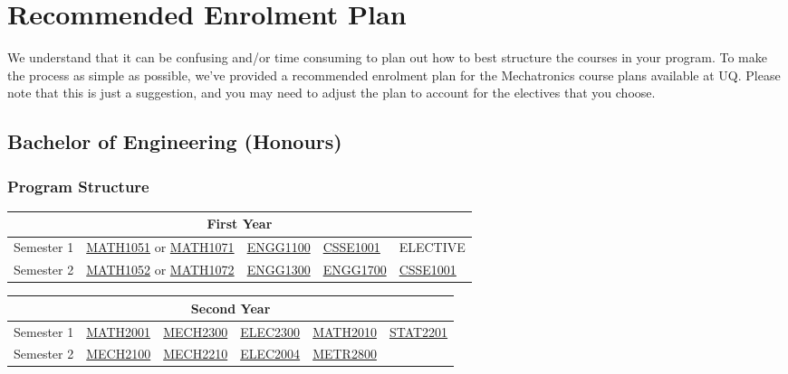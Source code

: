 \chapter{Recommended Enrolment Plan}
We understand that it can be confusing and/or time consuming to plan out how to best structure the courses in your program. To make the process as simple as possible, we've provided a recommended enrolment plan for the Mechatronics course plans available at UQ. Please note that this is just a suggestion, and you may need to adjust the plan to account for the electives that you choose.
\section{Bachelor of Engineering (Honours)}
\subsection{Program Structure}
\renewcommand{\arraystretch}{1.5}
\begin{table}[H]
    \centering
    \begin{tabular}{| m{6em} | m{5em} m{5em} m{5em} m{5em} m{5em} |}
        \hline
        \multicolumn{6}{|c|}{\bfseries First Year} \\
        \hline
        Semester 1 & \multicolumn{2}{c}{\hyperlink{MATH1051}{MATH1051} or \hyperlink{MATH1071}{MATH1071}} & \hyperlink{ENGG1100}{ENGG1100} & \hyperlink{CSSE1001}{CSSE1001} & ELECTIVE \\
        Semester 2 & \multicolumn{2}{c}{\hyperlink{MATH1052}{MATH1052} or \hyperlink{MATH1072}{MATH1072}} & \hyperlink{ENGG1300}{ENGG1300} & \hyperlink{ENGG1700}{ENGG1700} & \hyperlink{CSSE1001}{CSSE1001} \\
        \hline
    \end{tabular}
\end{table}
\begin{table}[H]
    \centering
    \begin{tabular}{| m{6em} | m{5em} m{5em} m{5em} m{5em} m{5em} |}
        \hline
        \multicolumn{6}{|c|}{\bfseries Second Year} \\
        \hline
        Semester 1 & \hyperlink{MATH2001}{MATH2001} & \hyperlink{MECH2300}{MECH2300} & \hyperlink{ELEC2300}{ELEC2300} & \hyperlink{MATH2010}{MATH2010} & \hyperlink{STAT2201}{STAT2201} \\
        Semester 2 & \hyperlink{MECH2100}{MECH2100} & \hyperlink{MECH2210}{MECH2210} & \hyperlink{ELEC2004}{ELEC2004} & \hyperlink{METR2800}{METR2800} & \\
        \hline
    \end{tabular}
\end{table}
